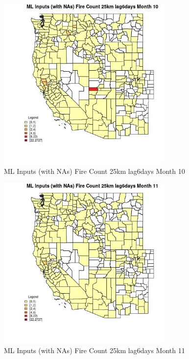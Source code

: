 \begin{figure} 
\centering  
\includegraphics[width=0.77\textwidth]{Code_Outputs/Report_ML_input_PM25_Step4_part_f_de_duplicated_aves_prioritize_24hr_obswNAs_CountyFire_Count_25km_lag6daysmedianMonth10.jpg} 
\caption{\label{fig:Report_ML_input_PM25_Step4_part_f_de_duplicated_aves_prioritize_24hr_obswNAsCountyFire_Count_25km_lag6daysmedianMonth10}ML Inputs (with NAs) Fire Count 25km lag6days Month 10} 
\end{figure} 
 

\begin{figure} 
\centering  
\includegraphics[width=0.77\textwidth]{Code_Outputs/Report_ML_input_PM25_Step4_part_f_de_duplicated_aves_prioritize_24hr_obswNAs_CountyFire_Count_25km_lag6daysmedianMonth11.jpg} 
\caption{\label{fig:Report_ML_input_PM25_Step4_part_f_de_duplicated_aves_prioritize_24hr_obswNAsCountyFire_Count_25km_lag6daysmedianMonth11}ML Inputs (with NAs) Fire Count 25km lag6days Month 11} 
\end{figure} 
 

